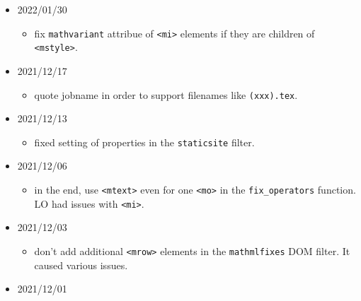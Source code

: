 \begin{itemize}
  \begin{itemize}
  \tightlist
  \item
    fixed support for some fonts in the ODT format.
  \item
    added \texttt{odtfonts} DOM filter.
  \end{itemize}
\item
  2022/01/30

  \begin{itemize}
  \tightlist
  \item
    fix \texttt{mathvariant} attribue of
    \texttt{\textless{}mi\textgreater{}} elements if they are children
    of \texttt{\textless{}mstyle\textgreater{}}.
  \end{itemize}
\item
  2021/12/17

  \begin{itemize}
  \tightlist
  \item
    quote jobname in order to support filenames like \texttt{(xxx).tex}.
  \end{itemize}
\item
  2021/12/13

  \begin{itemize}
  \tightlist
  \item
    fixed setting of properties in the \texttt{staticsite} filter.
  \end{itemize}
\item
  2021/12/06

  \begin{itemize}
  \tightlist
  \item
    in the end, use \texttt{\textless{}mtext\textgreater{}} even for one
    \texttt{\textless{}mo\textgreater{}} in the \texttt{fix\_operators}
    function. LO had issues with \texttt{\textless{}mi\textgreater{}}.
  \end{itemize}
\item
  2021/12/03

  \begin{itemize}
  \tightlist
  \item
    don't add additional \texttt{\textless{}mrow\textgreater{}} elements
    in the \texttt{mathmlfixes} DOM filter. It caused various issues.
  \end{itemize}
\item
  2021/12/01


\end{itemize}
